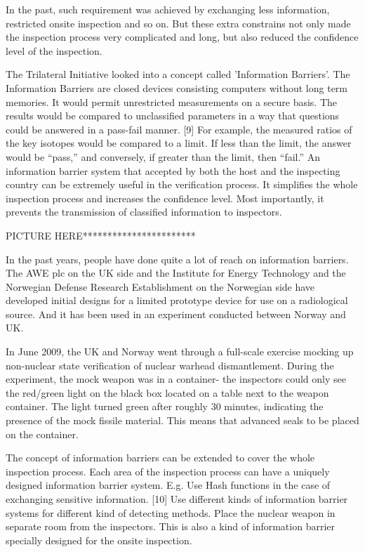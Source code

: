 \documentclass[twocolumn,a4paper]{article}
\begin{document}
In the past, such requirement was achieved by exchanging less 
information, restricted onsite inspection and so on. But these 
extra constrains not only made the inspection process very 
complicated and long, but also reduced the confidence level
of the inspection. 

The Trilateral Initiative looked into a concept called 'Information 
Barriers'. The Information Barriers are closed devices consisting 
computers without long term memories. It would permit unrestricted 
measurements on a secure basis. The results would be compared to 
unclassified parameters in a way that questions could be answered 
in a pass-fail manner. [9] For example, the measured ratios of the 
key isotopes would be compared to a limit. If less than the limit, 
the answer would be ``pass,'' and conversely, if greater than the limit, 
then ``fail.'' An information barrier system that accepted by both the
host and the inspecting country can be extremely useful in the 
verification process. It simplifies the whole inspection process 
and increases the confidence level. Most importantly, it prevents 
the transmission of classified information to inspectors.

PICTURE HERE***********************

In the past years, people have done quite a lot of reach on information
barriers. The AWE plc on the UK side and the Institute for Energy 
Technology and the Norwegian Defense Research Establishment on the 
Norwegian side have developed initial designs for a limited prototype
device for use on a radiological source. And it has been used in an 
experiment conducted between Norway and UK.

In June 2009, the UK and Norway went through a full-scale exercise 
mocking up non-nuclear state verification of nuclear warhead dismantlement.
During the experiment, the mock weapon was in a container- the inspectors 
could only see the red/green light on the black box located on a table 
next to the weapon container. The light turned green after roughly 30 
minutes, indicating the presence of the mock fissile material. This means
that advanced seals to be placed on the container.

The concept of information barriers can be extended to cover the whole 
inspection process. Each area of the inspection process can have a 
uniquely designed information barrier system. E.g. Use Hash functions 
in the case of exchanging sensitive information. [10] Use different 
kinds of information barrier systems for different kind of detecting 
methods. Place the nuclear weapon in separate room from the inspectors. 
This is also a kind of information barrier specially designed for the 
onsite inspection. 
\end{document}
